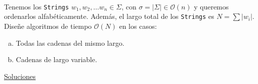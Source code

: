 \documentclass[dcc,uchile]{fcfmcourse}
\theoremstyle{plain}
\theoremstyle{definition}
\begin{document}
\begin{problems}
\\
Tenemos los \texttt{Strings} $w_{1}, w_{2},\ldots w_{n} \in \Sigma$, con $\sigma = |\Sigma| \in \mathcal{O}(n)$ y queremos ordenarlos alfabéticamente. Además, el largo total de los \texttt{Strings} es $N = \sum |w_{i}|$.\\ Diseñe algoritmos de tiempo $\mathcal{O}(N)$ en los casos:
\begin{enumerate}[a)]
    \item Todas las cadenas del mismo largo.
    \item Cadenas de largo variable.
\end{enumerate}
\end{problems}

\newpage
\begin{center}
{\huge \underline{Soluciones}}
\end{center}
\end{document}
